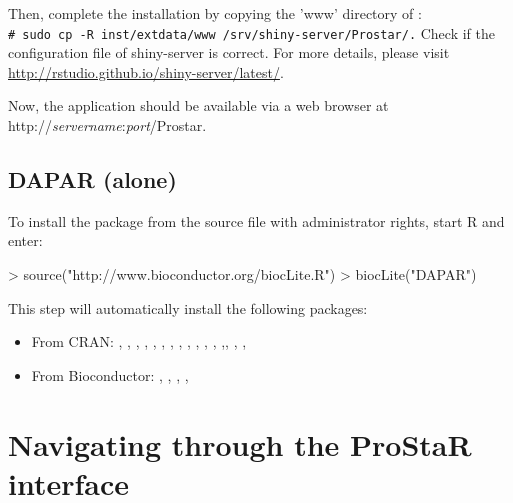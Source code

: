 \documentclass[12pt]{article}
\newcommand{\shellcmd}[1]{\\\indent\indent\texttt{\footnotesize\# #1}}
\begin{document}
Then, complete the installation by copying the 'www' directory of :\newline
\shellcmd{sudo cp -R inst/extdata/www /srv/shiny-server/Prostar/.}\newline
\newline
Check if the configuration file of shiny-server is correct.\newline
For more details, please visit \url{http://rstudio.github.io/shiny-server/latest/}.

Now, the application should be available via a web browser at http://\emph{servername}:\emph{port}/Prostar.



\subsection{DAPAR (alone)}\label{sec:daparalone}


To install the package  from the source file with administrator rights, start R and enter:

\begin{Schunk}
\begin{Sinput}
> source("http://www.bioconductor.org/biocLite.R")
> biocLite("DAPAR")
\end{Sinput}
\end{Schunk}

This step will automatically install the following packages:
\begin{itemize}
\item {From CRAN}: , , , , , , , , , , , , ,, , 
, 
\item {From Bioconductor}: , , , , 
\end{itemize}



\section{Navigating through the ProStaR interface}
\end{document}
